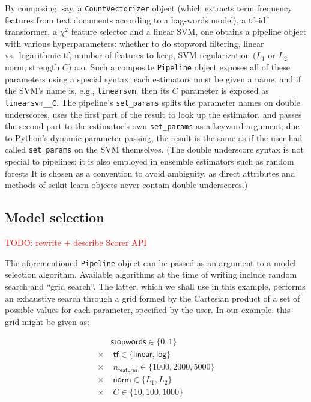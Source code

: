 \documentclass{llncs}
\begin{document}
By composing, say, a \texttt{CountVectorizer} object
(which extracts term frequency features from text documents
according to a bag-words model),
a \textsf{tf--idf} transformer, a $\chi^2$ feature selector and a linear SVM,
one obtains a pipeline object with various hyperparameters:
whether to do stopword filtering,
linear vs.\ logarithmic \textsf{tf}, number of features to keep,
SVM regularization ($L_1$ or $L_2$ norm, strength $C$) a.o.
Such a composite \texttt{Pipeline} object
exposes all of these parameters using a special syntax;
each estimators must be given a name,
and if the SVM's name is, e.g., \texttt{linearsvm},
then its $C$ parameter is exposed as \texttt{linearsvm\_\_C}.
The pipeline's \texttt{set\_params} splits the parameter names
on double underscores, uses the first part of the result
to look up the estimator,
and passes the second part to the estimator's own \texttt{set\_params}
as a keyword argument; due to Python's dynamic parameter passing,
the result is the same as if the user had called \texttt{set\_params}
on the SVM themselves.
(The double underscore syntax is not special to pipelines;
it is also employed in ensemble estimators such as random forests
It is chosen as a convention to avoid ambiguity, as direct
attributes and methods of scikit-learn objects never contain
double underscores.)

\subsection{Model selection}

\textcolor{red}{TODO: rewrite + describe Scorer API}

The aforementioned \texttt{Pipeline} object
can be passed as an argument to a model selection algorithm.
Available algorithms at the time of writing include random search
\citep{bergstra2012} and ``grid search''.
The latter, which we shall use in this example,
performs an exhaustive search through a grid formed by the Cartesian product
of a set of possible values for each parameter, specified by the user.
In our example, this grid might be given as:

\begin{align*}
         & \textsf{stopwords} \in \{0, 1\}                      \\
  \times & \; \textsf{tf} \in \{\textsf{linear}, \textsf{log}\} \\
  \times & \; n_\textsf{features} \in \{1000, 2000, 5000\}      \\
  \times & \; \textsf{norm} \in \{L_1, L_2\}                    \\
  \times & \; C \in \{10, 100, 1000\}
\end{align*}
\end{document}
